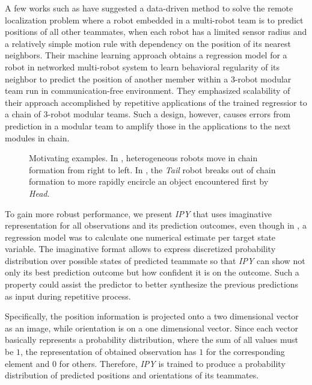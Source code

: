 \documentclass[letterpaper, 10 pt, conference]{ieeeconf}  %
\begin{document}
	A few works such as \cite{Choi17} have suggested a data-driven method to solve the 
	remote localization problem where a robot embedded in a multi-robot team is to predict 
	positions of all other teammates, when each robot has a limited sensor radius and
	a relatively simple motion rule with dependency on the position of its nearest neighbors. Their 
	machine learning approach obtains a regression model for a robot in 
	networked multi-robot system to learn behavioral regularity of its neighbor to 
	predict the position of another member within a 3-robot modular team run in communication-free
	environment. 
	They emphasized scalability of their approach accomplished by repetitive applications of the
	trained regressior to a chain of 3-robot modular teams. 
	Such a design, however, causes errors from prediction in a modular team to amplify 
	those in the applications to the next modules in chain. 
	
	\begin{figure}\centering
		\caption{Motivating examples.
			In \protect{}, heterogeneous robots move in
			chain formation from right to left. In
			\protect{}, the \emph{Tail} robot breaks
			out of chain formation to more rapidly encircle an object
			encountered first by \emph{Head}.
		}
		\label{fig:SampleChains}
	\end{figure}
	
	To gain more robust performance, we present \emph{IPY} that uses imaginative representation 
	for all observations and its prediction outcomes, even though in \cite{Choi17}, 
	a regression model was to calculate one numerical estimate per target state variable. 
	The imaginative format allows to express discretized probability distribution 
	over possible states of predicted teammate so that \emph{IPY} can show not only its best
	prediction outcome but how confident it is on the outcome. 
	Such a property could assist the predictor to better synthesize the previous predictions as
	input during repetitive process.
	
	Specifically, the position information is projected onto a two
	dimensional vector as an image, while orientation is on a one dimensional vector.
	Since each vector basically represents a probability distribution, where the sum of all values 
	must be $1$, the representation of obtained observation has $1$ for the corresponding element
	and $0$ for others. Therefore, \emph{IPY} is trained to produce a probability distribution of 
	predicted positions and orientations of its teammates. 
	
\end{document}
